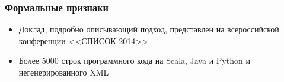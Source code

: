 \documentclass{beamer}
\begin{document}
\begin{frame}\frametitle{Формальные признаки}
\begin{itemize}
    \item Доклад, подробно описывающий подход, представлен на всероссийской конференции <<СПИСОК-2014>>
    \item Более 5000 строк программного кода на Scala, Java и Python и негенерированного XML
\end{itemize}
\end{frame}


\frame{\titlepage}
\end{document}
